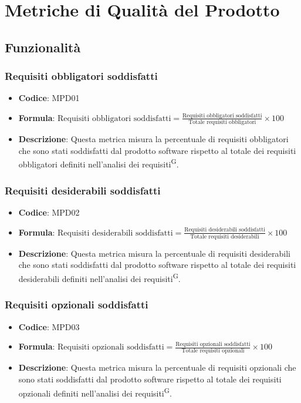\documentclass[a4paper, 11pt]{article}
\begin{document}
\section{Metriche di Qualità del Prodotto}

\subsection{Funzionalità}
\subsubsection{Requisiti obbligatori soddisfatti}
\begin{itemize}
    \item \textbf{Codice}: MPD01
    \item \textbf{Formula}: $\displaystyle \text{Requisiti obbligatori soddisfatti} = \frac{\text{Requisiti obbligatori soddisfatti}}{\text{Totale requisiti obbligatori}} \times 100$
    \item \textbf{Descrizione}: Questa metrica misura la percentuale di requisiti obbligatori che sono stati soddisfatti dal prodotto software rispetto al totale dei requisiti obbligatori definiti nell'analisi dei requisiti\textsuperscript{G}.
\end{itemize}
\subsubsection{Requisiti desiderabili soddisfatti}
\begin{itemize}
    \item \textbf{Codice}: MPD02
    \item \textbf{Formula}: $\displaystyle \text{Requisiti desiderabili soddisfatti} = \frac{\text{Requisiti desiderabili soddisfatti}}{\text{Totale requisiti desiderabili}} \times 100$
    \item \textbf{Descrizione}: Questa metrica misura la percentuale di requisiti desiderabili che sono stati soddisfatti dal prodotto software rispetto al totale dei requisiti desiderabili definiti nell'analisi dei requisiti\textsuperscript{G}.
\end{itemize}
\subsubsection{Requisiti opzionali soddisfatti}
\begin{itemize}
    \item \textbf{Codice}: MPD03
    \item \textbf{Formula}: $\displaystyle \text{Requisiti opzionali soddisfatti} = \frac{\text{Requisiti opzionali soddisfatti}}{\text{Totale requisiti opzionali}} \times 100$
    \item \textbf{Descrizione}: Questa metrica misura la percentuale di requisiti opzionali che sono stati soddisfatti dal prodotto software rispetto al totale dei requisiti opzionali definiti nell'analisi dei requisiti\textsuperscript{G}.
\end{itemize}
\end{document}
